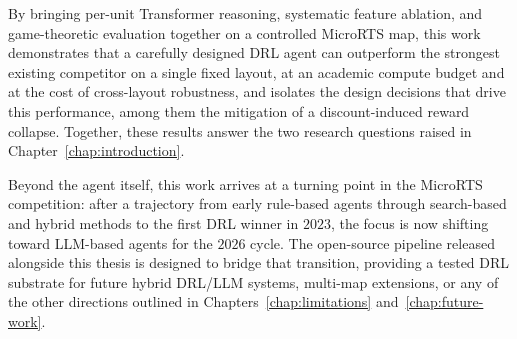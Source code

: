 \medskip

By bringing per-unit Transformer reasoning, systematic feature ablation, and game-theoretic evaluation together on a controlled MicroRTS map, this work demonstrates that a carefully designed DRL agent can outperform the strongest existing competitor on a single fixed layout, at an academic compute budget and at the cost of cross-layout robustness, and isolates the design decisions that drive this performance, among them the mitigation of a discount-induced reward collapse. Together, these results answer the two research questions raised in Chapter~\ref{chap:introduction}.

\medskip

Beyond the agent itself, this work arrives at a turning point in the MicroRTS competition: after a trajectory from early rule-based agents through search-based and hybrid methods to the first DRL winner in $2023$, the focus is now shifting toward LLM-based agents for the $2026$ cycle. The open-source pipeline released alongside this thesis is designed to bridge that transition, providing a tested DRL substrate for future hybrid DRL/LLM systems, multi-map extensions, or any of the other directions outlined in Chapters~\ref{chap:limitations} and~\ref{chap:future-work}.